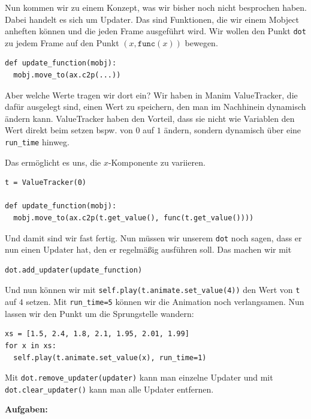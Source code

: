 \documentclass[a4paper, 12pt]{mksheetphhd}
\begin{document}
	Nun kommen wir zu einem Konzept, was wir bisher noch nicht besprochen haben. Dabei handelt es sich um Updater. Das sind Funktionen, die wir einem Mobject \glqq{}anheften\grqq{} können und die jeden Frame ausgeführt wird. Wir wollen den Punkt \verb*|dot| zu jedem Frame auf den Punkt $(x, \mathtt{func}(x))$ bewegen.
	
\begin{verbatim}
def update_function(mobj):
  mobj.move_to(ax.c2p(...))
\end{verbatim}

	Aber welche Werte tragen wir dort ein? Wir haben in Manim ValueTracker, die dafür ausgelegt sind, einen Wert zu speichern, den man im Nachhinein dynamisch ändern kann. ValueTracker haben den Vorteil, dass sie nicht wie Variablen den Wert direkt beim setzen bspw. von $0$ auf $1$ ändern, sondern dynamisch über eine \verb*|run_time| hinweg.
	
	Das ermöglicht es uns, die $x$-Komponente zu variieren.
	
\begin{verbatim}
t = ValueTracker(0)
	
def update_function(mobj):
  mobj.move_to(ax.c2p(t.get_value(), func(t.get_value())))
\end{verbatim}

	Und damit sind wir fast fertig. Nun müssen wir unserem \verb*|dot| noch sagen, dass er nun einen Updater hat, den er regelmäßig ausführen soll.
	Das machen wir mit
	
\begin{verbatim}
dot.add_updater(update_function)
\end{verbatim}

	Und nun können wir mit \verb|self.play(t.animate.set_value(4))| den Wert von \verb*|t| auf $4$ setzen. Mit \verb*|run_time=5| können wir die Animation noch verlangsamen. Nun lassen wir den Punkt um die Sprungstelle wandern:
	
	\begin{verbatim}
xs = [1.5, 2.4, 1.8, 2.1, 1.95, 2.01, 1.99]
for x in xs:
  self.play(t.animate.set_value(x), run_time=1)
	\end{verbatim}
	
	Mit \verb*|dot.remove_updater(updater)| kann man einzelne Updater und mit \verb*|dot.clear_updater()| kann man alle Updater entfernen.
	
	
\newpage

\textbf{Aufgaben:}
\end{document}
